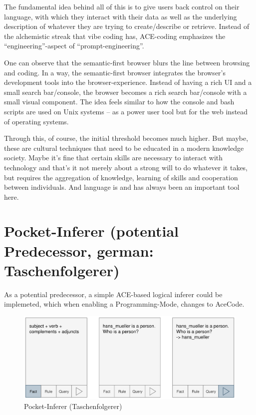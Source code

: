 \documentclass[12pt,a4paper]{article}
\begin{document}
The fundamental idea behind all of this is to give users back control on their language, with which they interact with their data as well as the underlying description of whatever they are trying to create/describe or retrieve. Instead of the alchemistic streak that vibe coding has, ACE-coding emphasizes the ``engineering''-aspect of ``prompt-engineering''.

One can observe that the semantic-first browser blurs the line between browsing and coding. In a way, the semantic-first browser integrates the browser's development tools into the browser-experience. Instead of having a rich UI and a small search bar/console, the browser becomes a rich search bar/console with a small visual component. The idea feels similar to how the console and bash scripts are used on Unix systems -- as a power user tool but for the web instead of operating systems.

Through this, of course, the initial threshold becomes much higher. But maybe, these are cultural techniques that need to be educated in a modern knowledge society. Maybe it's fine that certain skills are necessary to interact with technology and that's it not merely about a strong will to do whatever it takes, but requires the aggregation of knowledge, learning of skills and cooperation between individuals. And language is and has always been an important tool here.

\section{Pocket-Inferer (potential Predecessor, german: Taschenfolgerer)}

As a potential predecessor, a simple ACE-based logical inferer could be implemeted, which when enabling a Programming-Mode, changes to AceCode.

\begin{figure}[h]
    \includegraphics[width=16cm]{taschenfolgerer}
    \caption{Pocket-Inferer (Taschenfolgerer)}
\end{figure}
\end{document}

